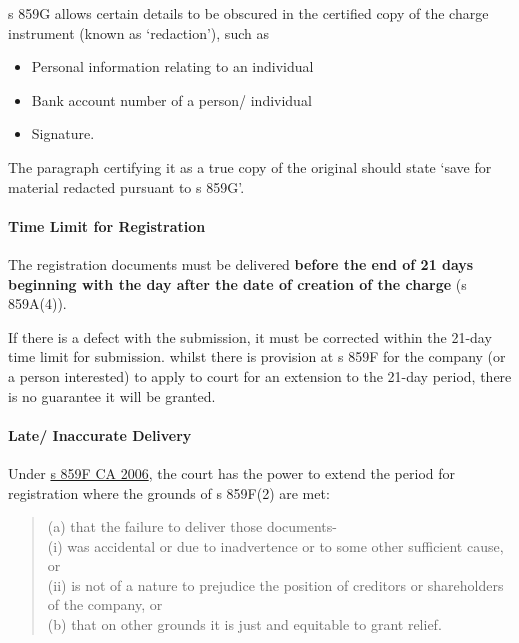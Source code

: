 \documentclass[
]{article}
\providecommand{\tightlist}{%
  \setlength{\itemsep}{0pt}\setlength{\parskip}{0pt}}
\begin{document}
s 859G allows certain details to be obscured in the certified copy of
the charge instrument (known as `redaction'), such as

\begin{itemize}
\tightlist
\item
  Personal information relating to an individual
\item
  Bank account number of a person/ individual
\item
  Signature.
\end{itemize}

The paragraph certifying it as a true copy of the original should state
`save for material redacted pursuant to s 859G'.

\hypertarget{time-limit-for-registration}{%
\paragraph{Time Limit for
Registration}\label{time-limit-for-registration}}

The registration documents must be delivered \textbf{before the end of
21 days beginning with the day after the date of creation of the charge}
(s 859A(4)).

If there is a defect with the submission, it must be corrected within
the 21-day time limit for submission. whilst there is provision at s
859F for the company (or a person interested) to apply to court for an
extension to the 21-day period, there is no guarantee it will be
granted.

\hypertarget{late-inaccurate-delivery}{%
\paragraph{Late/ Inaccurate Delivery}\label{late-inaccurate-delivery}}

Under \href{https://www.legislation.gov.uk/ukpga/2006/46/section/859F}{s
859F CA 2006}, the court has the power to extend the period for
registration where the grounds of s 859F(2) are met:

\begin{quote}
(a) that the failure to deliver those documents-\\
(i) was accidental or due to inadvertence or to some other sufficient
cause, or\\
(ii) is not of a nature to prejudice the position of creditors or
shareholders of the company, or\\
(b) that on other grounds it is just and equitable to grant relief.
\end{quote}
\end{document}
